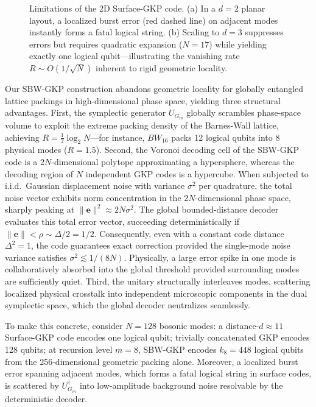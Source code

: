 \documentclass[aps,prl,twocolumn,superscriptaddress]{revtex4-2}
\newcommand{\bvec}[1]{\boldsymbol{#1}}
\begin{document}
\begin{figure}[t!]
{%
}
\caption{Limitations of the 2D Surface-GKP code. (a) In a $d=2$ planar layout, a localized burst error (red dashed line) on adjacent modes instantly forms a fatal logical string. (b) Scaling to $d=3$ suppresses errors but requires quadratic expansion ($N=17$) while yielding exactly one logical qubit---illustrating the vanishing rate $R \sim O(1/\sqrt{N})$ inherent to rigid geometric locality.}
\label{fig:surface_gkp_limitations}
\end{figure}

Our SBW-GKP construction abandons geometric locality for globally entangled lattice packings in high-dimensional phase space, yielding three structural advantages. First, the symplectic generator $U_{G_m}$ globally scrambles phase-space volume to exploit the extreme packing density of the Barnes-Wall lattice, achieving $R = \frac{1}{2}\log_2 N$---for instance, $BW_{16}$ packs 12 logical qubits into 8 physical modes ($R=1.5$). Second, the Voronoi decoding cell of the SBW-GKP code is a $2N$-dimensional polytope approximating a hypersphere, whereas the decoding region of $N$ independent GKP codes is a hypercube. When subjected to i.i.d.\ Gaussian displacement noise with variance $\sigma^2$ per quadrature, the total noise vector exhibits norm concentration in the $2N$-dimensional phase space, sharply peaking at $\|\bvec{e}\|^2 \approx 2N\sigma^2$. The global bounded-distance decoder evaluates this total error vector, succeeding deterministically if $\|\bvec{e}\| < \rho \sim \Delta/2 = 1/2$. Consequently, even with a constant code distance $\Delta^2 = 1$, the code guarantees exact correction provided the single-mode noise variance satisfies $\sigma^2 \lesssim 1/(8N)$. Physically, a large error spike in one mode is collaboratively absorbed into the global threshold provided surrounding modes are sufficiently quiet.  Third, the unitary structurally interleaves modes, scattering localized physical crosstalk into independent microscopic components in the dual symplectic space, which the global decoder neutralizes seamlessly.

To make this concrete, consider $N=128$ bosonic modes: a distance-$d \approx 11$ Surface-GKP code encodes one logical qubit; trivially concatenated GKP encodes 128 qubits; at recursion level $m=8$, SBW-GKP encodes $k_8 = 448$ logical qubits from the 256-dimensional geometric packing alone. Moreover, a localized burst error spanning adjacent modes, which forms a fatal logical string in surface codes, is scattered by $U_{G_m}^\dagger$ into low-amplitude background noise resolvable by the deterministic decoder.
\end{document}
